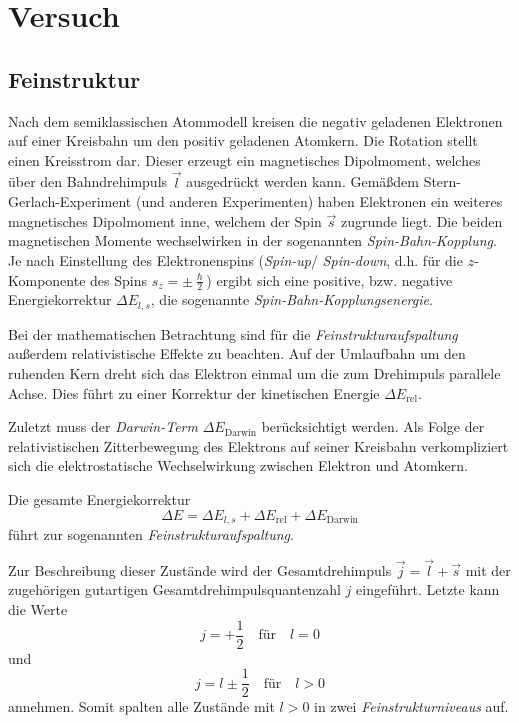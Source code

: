 \documentclass[../bericht.tex]{subfiles}
\begin{document}
  \chapter{Versuch}

    \section{Feinstruktur}
    \label{sec:feinstruktur}

      Nach dem semiklassischen Atommodell kreisen die negativ geladenen Elektronen auf einer Kreisbahn um den positiv geladenen Atomkern. Die Rotation stellt einen Kreisstrom dar. Dieser erzeugt ein magnetisches Dipolmoment, welches \"uber den Bahndrehimpuls $\vec{l}$ ausgedr\"uckt werden kann. Gem\"a\ss dem Stern-Gerlach-Experiment (und anderen Experimenten) haben Elektronen ein weiteres magnetisches Dipolmoment inne, welchem der Spin $\vec{s}$ zugrunde liegt. Die beiden magnetischen Momente wechselwirken in der sogenannten \textit{Spin-Bahn-Kopplung}. Je nach Einstellung des Elektronenspins (\textit{Spin-up}/ \textit{Spin-down}, d.h. f\"ur die $z$-Komponente des Spins $s_z=\pm \frac{\hslash}{2}$) ergibt sich eine positive, bzw. negative Energiekorrektur $\Delta E_{l,s}$, die sogenannte \textit{Spin-Bahn-Kopplungsenergie}.

      Bei der mathematischen Betrachtung sind f\"ur die \textit{Feinstrukturaufspaltung} au\ss{}erdem relativistische Effekte zu beachten. Auf der Umlaufbahn um den ruhenden Kern dreht sich das Elektron einmal um die zum Drehimpuls parallele Achse. Dies f\"uhrt zu einer Korrektur der kinetischen Energie $\Delta E_\mathrm{rel}$.

      Zuletzt muss der \textit{Darwin-Term} $\Delta E_\mathrm{Darwin}$ ber\"ucksichtigt werden. Als Folge der relativistischen Zitterbewegung des Elektrons auf seiner Kreisbahn verkompliziert sich die elektrostatische Wechselwirkung zwischen Elektron und Atomkern.
      \medskip

      Die gesamte Energiekorrektur
      \begin{equation*}
        \Delta E = \Delta E_{l,s} + \Delta E_\mathrm{rel} + \Delta E_\mathrm{Darwin}
      \end{equation*}
      f\"uhrt zur sogenannten \textit{Feinstrukturaufspaltung}.
      \medskip

      Zur Beschreibung dieser Zust\"ande wird der Gesamtdrehimpuls $\vec{j}=\vec{l}+\vec{s}$ mit der zugeh\"origen gutartigen Gesamtdrehimpulsquantenzahl $j$ eingef\"uhrt. Letzte kann die Werte
      \begin{equation*}
        j=+\frac{1}{2} \quad\text{f\"ur}\quad l=0
      \end{equation*}
      und
      \begin{equation*}
        j=l\pm \frac{1}{2}\quad\text{f\"ur}\quad l>0
      \end{equation*}
      annehmen. Somit spalten alle Zust\"ande mit $l>0$ in zwei \textit{Feinstrukturniveaus} auf.
\end{document}
